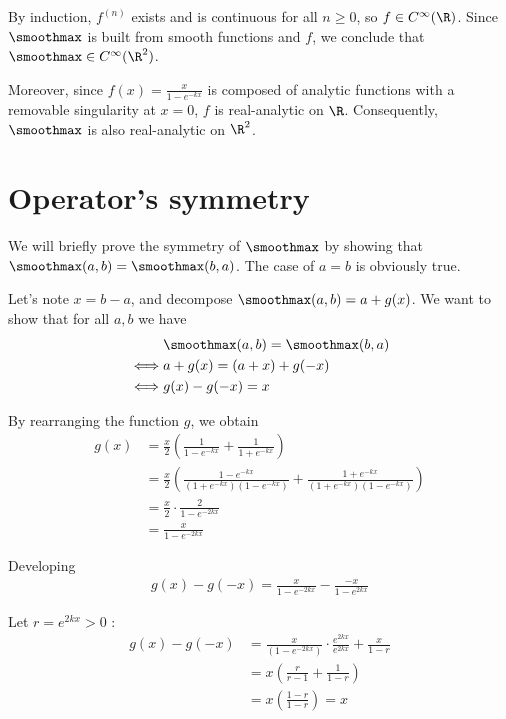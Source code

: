 By induction, $f^{(n)}$ exists and is continuous for all $n \geq 0$, so $f \in C^\infty(\R)$. Since $\smoothmax$ is built from smooth functions and $f$, we conclude that $\smoothmax \in C^\infty(\R^2)$.

\smallConclusion

Moreover, since $f(x) = \frac{x}{1 - e^{-kx}}$ is composed of analytic functions with a removable singularity at $x = 0$, $f$ is real-analytic on $\R$. Consequently, $\smoothmax$ is also real-analytic on $\R^2$.

\section{Operator's symmetry}
We will briefly prove the symmetry of $\smoothmax$ by showing that $\smoothmax(a, b) = \smoothmax(b, a)$. The case of $a = b$ is obviously true.

Let's note $x = b - a$, and decompose $\smoothmax(a, b) = a + g(x)$. We want to show that for all $a, b$ we have
\begin{align}
    & \smoothmax(a, b) = \smoothmax(b, a) \\
    \iff& a + g(x) = (a + x) + g(-x) \\
    \iff& g(x) - g(-x) = x
\end{align}

By rearranging the function $g$, we obtain 
\begin{align}
    g(x) &= \frac{x}{2} \left( \frac{1}{1 - e^{-kx}} + \frac{1}{1 + e^{-kx}} \right) \\
    &= \frac{x}{2} \left( \frac{1 - e^{-kx}}{(1 + e^{-kx})(1 - e^{-kx})} + \frac{1 + e^{-kx}}{(1 + e^{-kx})(1 - e^{-kx})} \right) \\
    &= \frac{x}{2} \cdot \frac{2}{1 - e^{-2kx}} \\
    &= \frac{x}{1 - e^{-2kx}}
\end{align}


Developing
\begin{align}
    g(x) - g(-x) = \frac{x}{1 - e^{-2kx}} - \frac{-x}{1 - e^{2kx}}
\end{align}

Let $r = e^{2kx} > 0$ :
\begin{align}
    g(x) - g(-x) &= \frac{x}{(1 - e^{-2kx})} \cdot \frac{e^{2kx}}{e^{2kx}} + \frac{x}{1 - r} \\
    &= x \left( \frac{r}{r - 1} + \frac{1}{1 - r} \right) \\
    &= x \left( \frac{1 - r}{1 - r} \right) = x
\end{align}

